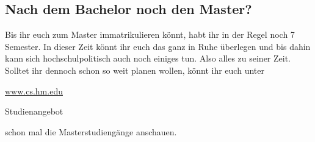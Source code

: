 \subsection{Nach dem Bachelor noch den Master?}
Bis ihr euch zum Master immatrikulieren könnt, habt ihr in der Regel 
noch 7 Semester. In dieser Zeit könnt ihr euch das ganz in Ruhe 
überlegen und bis dahin kann sich hochschulpolitisch auch noch einiges 
tun. Also alles zu seiner Zeit. Solltet ihr dennoch schon so weit planen 
wollen, könnt ihr euch unter 
\begin{sitenav}
	\item \url{www.cs.hm.edu}
	\item Studienangebot
\end{sitenav}
schon mal die Masterstudiengänge anschauen.